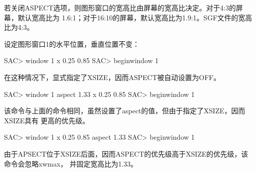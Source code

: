 若关闭ASPECT选项，则图形窗口的宽高比由屏幕的宽高比决定。对于4:3的屏幕，默认宽高比为
1.6:1；对于16:10的屏幕，默认宽高比为1.9:1。SGF文件的宽高比为4:3。

设定图形窗口1的水平位置，垂直位置不变：
\begin{SACCode}
SAC> window 1 x 0.25 0.85
SAC> beginwindow 1
\end{SACCode}
在这种情况下，显式指定了XSIZE，因而ASPECT被自动设置为OFF。

\begin{SACCode}
SAC> window 1 aspect 1.33 x 0.25 0.85
SAC> beginwindow 1
\end{SACCode}
该命令与上面的命令相同，虽然设置了aspect的值，但由于指定了XSIZE，因而XSIZE具有
更高的优先级。

\begin{SACCode}
SAC> window 1 x 0.25 0.85 aspect 1.33
SAC> beginwindow 1
\end{SACCode}
由于APSECT位于XSIZE后面，因而ASPECT的优先级高于XSIZE的优先级，该命令会忽略xwmax，
并固定宽高比为1.33。

